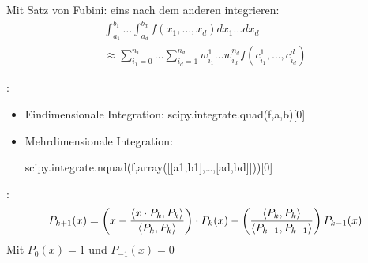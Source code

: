 \vspace{1\baselineskip}

 {

    Mit Satz von Fubini: eins nach dem anderen integrieren:
    \begin{align*}
        \int_{a_1}^{b_1} \dots \int_{a_d}^{b_d} f(x_1,\dots,x_d) dx_1 \dots dx_d
        \\
        \approx \sum_{i_1 = 0}^{n_1} \dots \sum_{i_d = 1}^{n_d} w_{i_1}^1 \dots w_{i_d}^{n_d} f(c_{i_1}^1 , \dots , c_{i_d}^d)
    \end{align*}
}

\vspace{1\baselineskip}

:
\begin{itemize}
    \item Eindimensionale Integration: scipy.integrate.quad(f,a,b)[0]
    \item Mehrdimensionale Integration: 
    
            scipy.integrate.nquad(f,array([[a1,b1],\dots,[ad,bd]]))[0]
\end{itemize}

\vspace{1\baselineskip}

:
\begin{align*}
    P_{k+1} (x) = \left( x- \frac{\left\langle x \cdot P_k , P_k \right\rangle}{\left\langle P_k , P_k \right\rangle} \right) \cdot P_{k} (x)
        -  \left( \frac{\left\langle P_k , P_k \right\rangle}{\left\langle P_{k-1} , P_{k-1} \right\rangle} \right) P_{k-1} (x)
\end{align*}
Mit $P_0 (x) =1$ und $P_{-1} (x) = 0$
 
\vspace{1\baselineskip}


